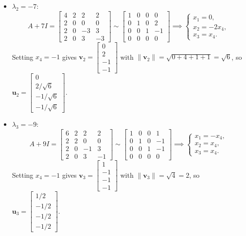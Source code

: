 \documentclass[11pt, letterpaper]{article}
\theoremstyle{definition}
\theoremstyle{remark}
\begin{document}
\begin{itemize}
    \item $\lambda_2 = -7$:
    \[
    A + 7I = \begin{bmatrix} 4 & 2 & 2 & 2 \\ 2 & 0 & 0 & 0 \\ 2 & 0 & -3 & 3 \\ 2 & 0 & 3 & -3 \end{bmatrix} \sim \begin{bmatrix} 1 & 0 & 0 & 0 \\ 0 & 1 & 0 & 2 \\ 0 & 0 & 1 & -1 \\ 0 & 0 & 0 & 0 \end{bmatrix} \implies \begin{cases} x_1 = 0, \\ x_2 = -2x_4, \\ x_3 = x_4. \end{cases}
    \]
    Setting $x_4 = -1$ gives $\mathbf{v}_2 = \begin{bmatrix} 0 \\ 2 \\ -1 \\ -1 \end{bmatrix}$ with $\|\mathbf{v}_2\| = \sqrt{0 + 4 + 1 + 1} = \sqrt{6}$, so $\mathbf{u}_2 = \begin{bmatrix} 0 \\ 2/\sqrt{6} \\ -1/\sqrt{6} \\ -1/\sqrt{6} \end{bmatrix}$.

    \item $\lambda_3 = -9$:
    \[
    A + 9I = \begin{bmatrix} 6 & 2 & 2 & 2 \\ 2 & 2 & 0 & 0 \\ 2 & 0 & -1 & 3 \\ 2 & 0 & 3 & -1 \end{bmatrix} \sim \begin{bmatrix} 1 & 0 & 0 & 1 \\ 0 & 1 & 0 & -1 \\ 0 & 0 & 1 & -1 \\ 0 & 0 & 0 & 0 \end{bmatrix} \implies \begin{cases} x_1 = -x_4, \\ x_2 = x_4, \\ x_3 = x_4. \end{cases}
    \]
    Setting $x_4 = -1$ gives $\mathbf{v}_3 = \begin{bmatrix} 1 \\ -1 \\ -1 \\ -1 \end{bmatrix}$ with $\|\mathbf{v}_3\| = \sqrt{4} = 2$, so $\mathbf{u}_3 = \begin{bmatrix} 1/2 \\ -1/2 \\ -1/2 \\ -1/2 \end{bmatrix}$.


\end{itemize}
\end{document}

